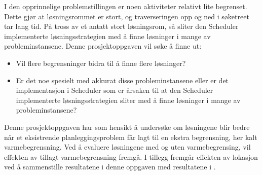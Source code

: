 I den opprinnelige problemstillingen \cite{tvedtbezem} er noen aktiviteter relativt lite begrenset. Dette gjør at løsningsrommet er stort, og traverseringen opp og ned i søketreet tar lang tid. På tross av et antatt stort løsningsrom, så sliter den Scheduler implementerte løsningsstrategien med å finne løsninger i mange av probleminstansene. Denne prosjektoppgaven vil søke å finne ut:

\begin{itemize}
\item Vil flere begrensninger bidra til å finne flere løsninger?
\item Er det noe spesielt med akkurat disse probleminstansene eller er det implementasjon i Scheduler som er årsaken til at den Scheduler implementerte løsningsstrategien sliter med å finne løsninger i mange av probleminstansene?
\end{itemize}

Denne prosjektoppgaven har som hensikt å undersøke om løsningene blir bedre når et eksistrende planleggingsproblem får lagt til en ekstra begrensning, her kalt varmebegrensning. Ved å evaluere løsningene med og uten varmebegrensing, vil effekten av tillagt varmebegrensning fremgå. I tillegg fremgår effekten av lokasjon ved å sammenstille resultatene i denne oppgaven med resultatene i \cite{tvedtbezem}.